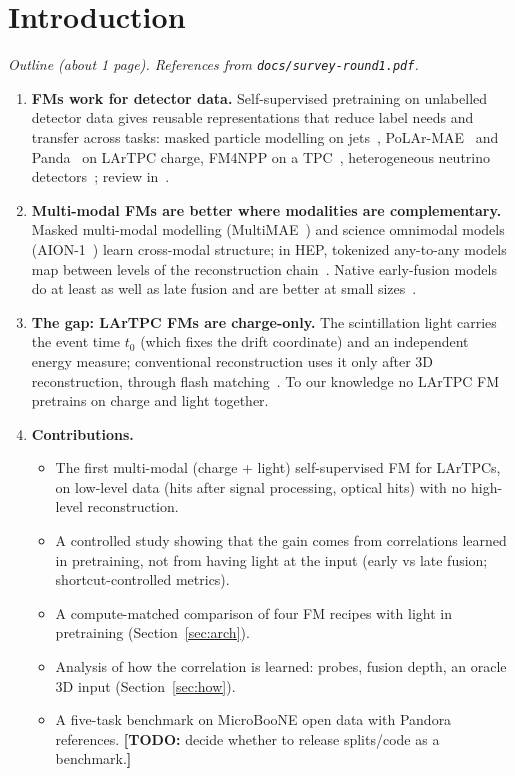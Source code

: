 \documentclass[11pt,a4paper]{article}
\newcommand{\code}[1]{\texttt{\small #1}}
\newcommand{\todo}[1]{{\color{plan}\textbf{[TODO:} #1\textbf{]}}}
\begin{document}
\section{Introduction}\label{sec:intro}
{\color{plan}\textit{Outline (about 1 page). References from \code{docs/survey-round1.pdf}.}}
\begin{enumerate}
  \item \textbf{FMs work for detector data.} Self-supervised pretraining on unlabelled detector data gives reusable representations that reduce label needs and transfer across tasks: masked particle modelling on jets~\cite{mpm,mpmv2}, PoLAr-MAE~\cite{polarmae} and Panda~\cite{panda,pandav2} on LArTPC charge, FM4NPP on a TPC~\cite{fm4npp}, heterogeneous neutrino detectors~\cite{fasercal}; review in~\cite{hallin}.
  \item \textbf{Multi-modal FMs are better where modalities are complementary.} Masked multi-modal modelling (MultiMAE~\cite{multimae}) and science omnimodal models (AION-1~\cite{aion}) learn cross-modal structure; in HEP, tokenized any-to-any models map between levels of the reconstruction chain~\cite{prompting,heptokens}. Native early-fusion models do at least as well as late fusion and are better at small sizes~\cite{shukor}.
  \item \textbf{The gap: LArTPC FMs are charge-only.} The scintillation light carries the event time $t_0$ (which fixes the drift coordinate) and an independent energy measure; conventional reconstruction uses it only after 3D reconstruction, through flash matching~\cite{pandora}. To our knowledge no LArTPC FM pretrains on charge and light together.
  \item \textbf{Contributions.}
  \begin{itemize}
    \item The first multi-modal (charge + light) self-supervised FM for LArTPCs, on low-level data (hits after signal processing, optical hits) with no high-level reconstruction.
    \item A controlled study showing that the gain comes from correlations learned in pretraining, not from having light at the input (early vs late fusion; shortcut-controlled metrics).
    \item A compute-matched comparison of four FM recipes with light in pretraining (Section~\ref{sec:arch}).
    \item Analysis of how the correlation is learned: probes, fusion depth, an oracle 3D input (Section~\ref{sec:how}).
    \item A five-task benchmark on MicroBooNE open data with Pandora references. \todo{decide whether to release splits/code as a benchmark.}
  \end{itemize}
\end{enumerate}
\end{document}
